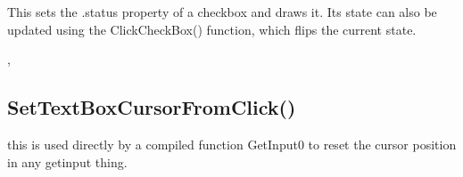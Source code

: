 \documentclass[letterpaper,10pt,english]{sphinxmanual}
\begin{document}
\sphinxAtStartPar
{}

\sphinxAtStartPar
This sets the .status property of a checkbox and draws it. Its state can also be updated using the ClickCheckBox() function, which flips the current state.

\sphinxAtStartPar
{}

\begin{sphinxVerbatim}[commandchars=\\\{\}]
\end{sphinxVerbatim}

\sphinxAtStartPar
{}

\begin{sphinxVerbatim}[commandchars=\\\{\}]
\end{sphinxVerbatim}

\sphinxAtStartPar
{}

\sphinxAtStartPar
{}, 

\ignorespaces 

\subsection{SetTextBoxCursorFromClick()}
\label{\detokenize{reference/ui:settextboxcursorfromclick}}\label{\detokenize{reference/ui:index-29}}
\sphinxAtStartPar
{}

\sphinxAtStartPar
this is used directly by a compiled function GetInput0
to reset the cursor position in any getinput thing.

\sphinxAtStartPar
{}
\end{document}

